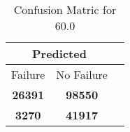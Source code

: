 \begin{table}[] 
\caption{Confusion Matric for 60.0} 
\label{Table: Prediction Accuracy-DMD60.0OnlySunEKF-resetReflectionEKF-top2-Reflection} 
\centering 
\begin{tabular} 
 {@{}ccc@{}} 
\toprule 
\multicolumn{2}{c}{\textbf{Predicted}}
 \\ \midrule 
\multicolumn{1}{|c|}{Failure} & 
\multicolumn{1}{c|}{No Failure}
 \\ \midrule 
\multicolumn{1}{|c|}{\color{green}\textbf{26391}} & 
\multicolumn{1}{c|}{\color{green}\textbf{98550}}
 \\ \midrule 
\multicolumn{1}{|c|}{\color{red}\textbf{3270}} & 
\multicolumn{1}{c|}{\color{red}\textbf{41917}}
 \\ \bottomrule 
\end{tabular} 
\end{table} 
